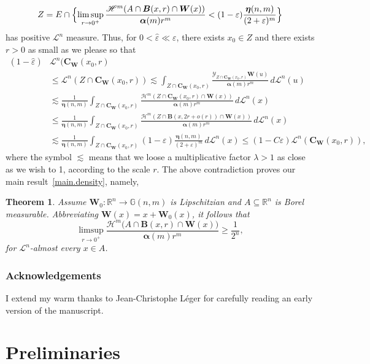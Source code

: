 \documentclass[JEP,XML,SOM,Unicode,ThmDefs,NoEqCountersInSection]{cedram}
\newtheorem*{Theorem*}{Theorem}
\newcommand{\R}{\mathbb{R}}
\newcommand{\Rn}{\R^n}
\newcommand{\calH}{\mathscr{H}}
\newcommand{\calL}{\mathscr{L}}
\newcommand{\calY}{\mathscr{Y}}
\newcommand{\balpha}{\boldsymbol{\alpha}}
\newcommand{\boldeta}{\boldsymbol{\eta}}
\newcommand{\bB}{{\boldsymbol{B}}}
\newcommand{\bC}{{\boldsymbol{C}}}
\newcommand{\bW}{{\boldsymbol{W}}}
\newcommand{\bG}{\mathbb{G}}
\let\veps\varepsilon
\let\subset\subseteq
\begin{document}
\begin{equation*}
Z = E \cap \Bigl\{ \limsup_{r \to 0^+} \frac{\calH^m (A \cap \bB(x,r) \cap \bW(x))}{\balpha(m)r^m} < (1-\veps) \frac{\boldeta(n,m)}{(2+\veps)^m} \Bigr\}
\end{equation*}
has positive $\calL^n$ measure.
Thus, for $0 < \hat{\veps} \ll \veps$, there exists $x_0 \in Z$ and there exists $r > 0$ as small as we please so that\vspace*{-3pt}
\begin{align*}
(1 - \hat{\veps})& \calL^n (\bC_\bW(x_0,r)\\[-3pt]
&\leq \calL^n \left(Z \cap \bC_\bW(x_0,r) \right) \lesssim \int_{Z \cap \bC_\bW(x_0,r)} \frac{\calY_{Z \cap \bC_\bW(x_0,r)} \bW(u)}{\balpha(m)r^m} \,d\calL^n(u) \\
&\lesssim \frac{1}{\boldeta(n,m)} \int_{Z \cap \bC_\bW(x_0,r)} \frac{\calH^m(Z \cap \bC_\bW(x_0,r) \cap \bW(x))}{\balpha(m)r^m} \,d\calL^n(x)\\
&\leq \frac{1}{\boldeta(n,m)} \int_{Z \cap \bC_\bW(x_0,r)} \frac{\calH^m(Z \cap \bB(x,2r+o(r)) \cap \bW(x))}{\balpha(m)r^m} \,d\calL^n(x) \\
&\lesssim \frac{1}{\boldeta(n,m)} \int_{Z \cap \bC_\bW(x_0,r)} (1-\veps) \frac{\boldeta(n,m)}{(2+\veps)^m} \,d\calL^n(x) \leq (1-C\veps) \calL^n(\bC_\bW(x_0,r)),
\end{align*}
where the symbol $\lesssim$ means that we loose a multiplicative factor $\lambda > 1$ as close as we wish to 1, according to the scale $r$.
The above contradiction proves our main result~\ref{main.density}, namely,
\begin{Theorem*}
Assume $\bW_0: \Rn \to \bG(n,m)$ is Lipschitzian and $A \subset \Rn$ is Borel measurable. Abbreviating $\bW(x) = x + \bW_0(x)$, it follows that
\begin{equation*}
\limsup_{r \to 0^+} \frac{\calH^m \big(A \cap \bB(x,r) \cap \bW(x) \big)}{\balpha(m)r^m} \geq \frac{1}{2^n},
\end{equation*}
for $\calL^n$-almost every $x \in A$.
\end{Theorem*}

\subsubsection*{Acknowledgements}
I extend my warm thanks to Jean-Christophe Léger for carefully reading an early version of the manuscript.

\section{Preliminaries}
\end{document}
